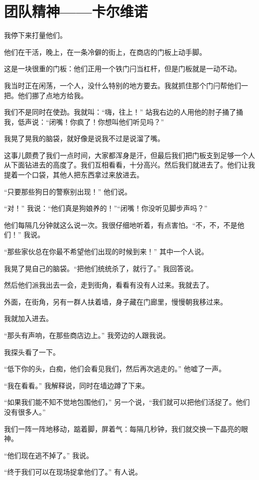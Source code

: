 \section{  团队精神——卡尔维诺}

我停下来打量他们。


他们在干活，晚上，在一条冷僻的街上，在商店的门板上动手脚。　


这是一块很重的门板：他们正用一个铁门闩当杠杆，但是门板就是一动不动。


我当时正在闲荡，一个人，没什么特别的地方要去。我就抓住那个门闩帮他们一把。他们挪了点地方给我。


我们不是同时在使劲。我就叫：“嗨，往上！” 站我右边的人用他的肘子捅了捅我，低声说：“闭嘴！你疯了！你想叫他们听见吗？”


我晃了晃我的脑袋，就好像是说我不过是说溜了嘴。


这事儿颇费了我们一点时间，大家都浑身是汗，但最后我们把门板支到足够一个人从下面钻进去的高度了。我们互相看看，十分高兴。然后我们就进去了。他们让我提着一个口袋，其他人把东西拿过来放进去。


“只要那些狗日的警察别出现！” 他们说。
　


“对！” 我说：“他们真是狗娘养的！”“闭嘴！你没听见脚步声吗？” 


他们每隔几分钟就这么说一次。我很仔细地听着，有点害怕。“不，不，不是他们！” 我说。


“那些家伙总在你最不希望他们出现的时候到来！” 其中一个人说。


我晃了晃自己的脑袋。“把他们统统杀了，就行了。” 我回答说。


然后他们派我出去一会，走到街角，看看有没有人过来。我就去了。


外面，在街角，另有一群人扶着墙，身子藏在门廊里，慢慢朝我移过来。


我就加入进去。


“那头有声响，在那些商店边上。” 我旁边的人跟我说。


我探头看了一下。


“低下你的头，白痴，他们会看见我们，然后再次逃走的。” 他嘘了一声。


“我在看看。” 我解释说，同时在墙边蹲了下来。
　

“如果我们能不知不觉地包围他们，” 另一个说，“我们就可以把他们活捉了。他们没有很多人。”


我们一阵一阵地移动，踮着脚，屏着气：每隔几秒钟，我们就交换一下晶亮的眼神。


“他们现在逃不掉了。” 我说。


“终于我们可以在现场捉拿他们了。” 有人说。


